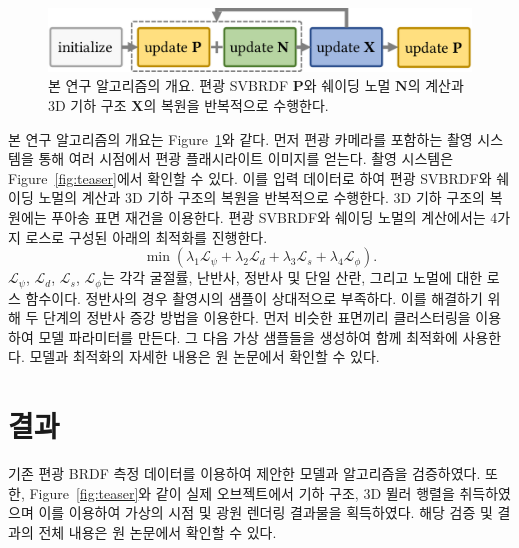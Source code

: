 \documentclass[a4paper,twocolumn]{article}
\begin{document}
\begin{figure}[tpb]
	\vspace{-2mm}%
	\centering%
	\footnotesize%
	\includegraphics[width=1.0\linewidth]{fig/pipeline-workflow}%
	\vspace{-3mm}%
	\caption{\label{fig:workflow}%
		본 연구 알고리즘의 개요. 편광 SVBRDF $\mathbf{P}$와 쉐이딩 노멀 $\mathbf{N}$의 계산과 3D 기하 구조 $\mathbf{X}$의 복원을 반복적으로 수행한다.
	}
	\vspace{-2mm}
\end{figure}
본 연구 알고리즘의 개요는 Figure~\ref{fig:workflow}와 같다. 먼저 편광 카메라를 포함하는 촬영 시스템을 통해 여러 시점에서 편광 플래시라이트 이미지를 얻는다. 촬영 시스템은 Figure~\ref{fig:teaser}에서 확인할 수 있다.
이를 입력 데이터로 하여 편광 SVBRDF와 쉐이딩 노멀의 계산과 3D 기하 구조의 복원을 반복적으로 수행한다. 
3D 기하 구조의 복원에는 푸아송 표면 재건을\cite{kazhdan2013screened} 이용한다.
편광 SVBRDF와 쉐이딩 노멀의 계산에서는 4가지 로스로 구성된 아래의 최적화를 진행한다.
\begin{equation}
	\label{eq:optimization}
	{\min}\left( {{\lambda }_{1}}{{\mathcal{L}}_{\psi}}+{{\lambda }_{2}}{{\mathcal{L}}_{d}}+{{\lambda }_{3}}{{\mathcal{L}}_{s}}+{{\lambda }_{4}}{{\mathcal{L}}_{\phi}} \right).
\end{equation}
%
${{\mathcal{L}}_{\psi}}$, ${{\mathcal{L}}_{d}}$, ${{\mathcal{L}}_{s}}$, ${{\mathcal{L}}_{\phi}}$는 각각 굴절률, 난반사, 정반사 및 단일 산란, 그리고 노멀에 대한 로스 함수이다.
정반사의 경우 촬영시의 샘플이 상대적으로 부족하다. 이를 해결하기 위해 두 단계의 정반사 증강 방법을 이용한다.
먼저 비슷한 표면끼리 클러스터링을 이용하여 모델 파라미터를 만든다. 그 다음 가상 샘플들을 생성하여 함께 최적화에 사용한다.
모델과 최적화의 자세한 내용은 원 논문에서 확인할 수 있다.~\cite{Ellipsometry:SIG:2022}


\section{결과}
\label{sec:results}
기존 편광 BRDF 측정 데이터를 이용하여 제안한 모델과 알고리즘을 검증하였다. 또한, Figure~\ref{fig:teaser}와 같이 실제 오브젝트에서 기하 구조, 3D 뮐러 행렬을 취득하였으며 이를 이용하여 가상의 시점 및 광원 렌더링 결과물을 획득하였다.
해당 검증 및 결과의 전체 내용은 원 논문에서 확인할 수 있다.
\end{document}
